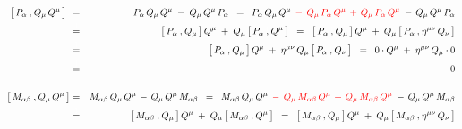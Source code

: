 \begin{eqnarray*}
{\color{white}.}
\left[\,
	P_{\alpha}
	\,\overset{{\color{white}1}}{,}\,
	Q_{\mu}\,Q^{\mu}
	\,\right]
	{\color{white}.}
& = &
	P_{\alpha}\,Q_{\mu}\,Q^{\mu}
	\;-\;
	Q_{\mu}\,Q^{\mu}\,P_{\alpha}
\;\; = \;\;
	P_{\alpha}\,Q_{\mu}\,Q^{\mu}
	{\color{red}
	\;\,-\;\,
	Q_{\mu}\,P_{\alpha}\,Q^{\mu}
	\,+\,
	Q_{\mu}\,P_{\alpha}\,Q^{\mu}
	}
	\;-\,
	Q_{\mu}\,Q^{\mu}\,P_{\alpha}
\\
& \overset{{\color{white}\textnormal{\small$1$}}}{=} &
	\left[\,
		P_{\alpha}
		\,\overset{{\color{white}1}}{,}\,
		Q_{\mu}
		\,\right]	
	Q^{\mu}
	\;+\;
	Q_{\mu}
	\left[\,
		P_{\alpha}
		\,\overset{{\color{white}1}}{,}\,
		Q^{\mu}
		\,\right]
\;\; = \;\;
	\left[\,
		P_{\alpha}
		\,\overset{{\color{white}1}}{,}\,
		Q_{\mu}
		\,\right]	
	Q^{\mu}
	\;+\;
	Q_{\mu}
	\left[\,
		P_{\alpha}
		\,\overset{{\color{white}1}}{,}\,
		\eta^{\mu\nu}\,Q_{\nu}
		\,\right]
\\
& \overset{{\color{white}\textnormal{\small$1$}}}{=} &
	\left[\,
		P_{\alpha}
		\,\overset{{\color{white}1}}{,}\,
		Q_{\mu}
		\,\right]	
	Q^{\mu}
	\;+\;
	\eta^{\mu\nu}\,Q_{\mu}
	\left[\,
		P_{\alpha}
		\,\overset{{\color{white}1}}{,}\,
		Q_{\nu}
		\,\right]
\;\; = \;\;
	0 \cdot Q^{\mu}
	\;+\;
	\eta^{\mu\nu}\,Q_{\mu}\cdot 0
\\
& \overset{{\color{white}\textnormal{\small$1$}}}{=} &
	0
\\ \\
\left[\,
	M_{\alpha\beta}
	\,\overset{{\color{white}1}}{,}\,
	Q_{\mu}\,Q^{\mu}
	\,\right]
& = &
	M_{\alpha\beta}\,Q_{\mu}\,Q^{\mu}
	\,-\,
	Q_{\mu}\,Q^{\mu}\,M_{\alpha\beta}
\;\; = \;\;
	M_{\alpha\beta}\,Q_{\mu}\,Q^{\mu}
	{\color{red}
	\;\,-\;\,
	Q_{\mu}\,M_{\alpha\beta}\,Q^{\mu}
	\,+\,
	Q_{\mu}\,M_{\alpha\beta}\,Q^{\mu}
	}
	\;-\,
	Q_{\mu}\,Q^{\mu}\,M_{\alpha\beta}
\\
& \overset{{\color{white}\textnormal{\small$1$}}}{=} &
	\left[\,
		M_{\alpha\beta}
		\,\overset{{\color{white}1}}{,}\,
		Q_{\mu}
		\,\right]
	Q^{\mu}
	\;+\;
	Q_{\mu}
	\left[\,
		M_{\alpha\beta}
		\,\overset{{\color{white}1}}{,}\,
		Q^{\mu}
		\,\right]
\;\; = \;\;
	\left[\,
		M_{\alpha\beta}
		\,\overset{{\color{white}1}}{,}\,
		Q_{\mu}
		\,\right]
	Q^{\mu}
	\;+\;
	Q_{\mu}
	\left[\,
		M_{\alpha\beta}
		\,\overset{{\color{white}1}}{,}\,
		\eta^{\mu\nu}\,Q_{\nu}
		\,\right]
\\

\end{eqnarray*}
